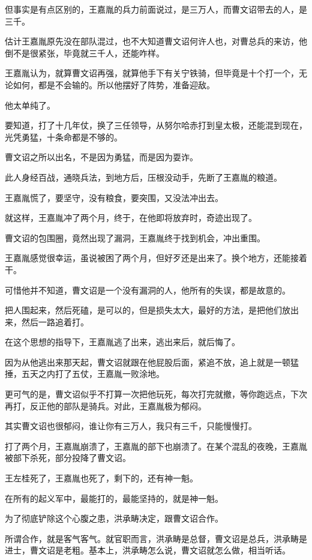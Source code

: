 \begin{multicols}{\theparacolNo}
		但事实是有点区别的，王嘉胤的兵力前面说过，是三万人，而曹文诏带去的人，是三千。

		估计王嘉胤原先没在部队混过，也不大知道曹文诏何许人也，对曹总兵的来访，他倒不是很紧张，毕竟就三千人，还能咋样。

		王嘉胤认为，就算曹文诏再强，就算他手下有关宁铁骑，但毕竟是十个打一个，无论如何，都是不会输的。所以他摆好了阵势，准备迎敌。

		他太单纯了。

		要知道，打了十几年仗，换了三任领导，从努尔哈赤打到皇太极，还能混到现在，光凭勇猛，十条命都是不够的。

		曹文诏之所以出名，不是因为勇猛，而是因为耍诈。

		此人身经百战，通晓兵法，到地方后，压根没动手，先断了王嘉胤的粮道。

		王嘉胤慌了，要坚守，没有粮食，要突围，又没法冲出去。

		就这样，王嘉胤冲了两个月，终于，在他即将放弃时，奇迹出现了。

		曹文诏的包围圈，竟然出现了漏洞，王嘉胤终于找到机会，冲出重围。

		王嘉胤感觉很幸运，虽说被困了两个月，但好歹还是出来了。换个地方，还能接着干。

		可惜他并不知道，曹文诏是一个没有漏洞的人，他所有的失误，都是故意的。

		把人围起来，然后死磕，是可以的，但是损失太大，最好的方法，是把他们放出来，然后一路追着打。

		在这个思想的指导下，王嘉胤逃了出来，逃出来后，就后悔了。

		因为从他逃出来那天起，曹文诏就跟在他屁股后面，紧追不放，追上就是一顿猛捶，五天之内打了五仗，王嘉胤一败涂地。

		更可气的是，曹文诏似乎不打算一次把他玩死，每次打完就撤，等你跑远点，下次再打，反正他的部队是骑兵。对此，王嘉胤极为郁闷。

		其实曹文诏也很郁闷，谁让你有三万人，我只有三千，只能慢慢打。

		打了两个月，王嘉胤崩溃了，王嘉胤的部下也崩溃了。在某个混乱的夜晚，王嘉胤被部下杀死，部分投降了曹文诏。

		王左桂死了，王嘉胤也死了，剩下的，还有神一魁。

		在所有的起义军中，最能打的，最能坚持的，就是神一魁。

		为了彻底铲除这个心腹之患，洪承畴决定，跟曹文诏合作。

		所谓合作，就是客气客气。就官职而言，洪承畴是总督，曹文诏是总兵，洪承畴是进士，曹文诏是老粗。基本上，洪承畴怎么说，曹文诏就怎么做，相当听话。


\end{multicols}
